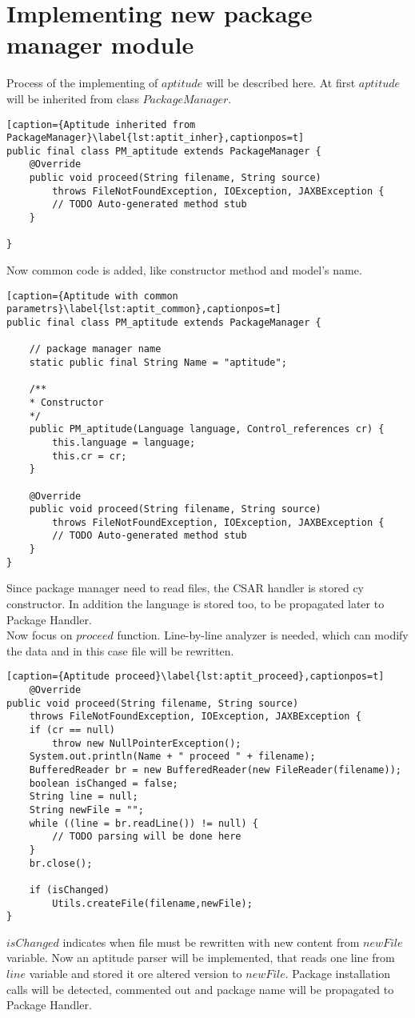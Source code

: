 \section{Implementing new package manager module}\label{sec:aptitude_imp}
Process of the implementing of $aptitude$ will be described here.
At first $aptitude$ will be inherited from class $PackageManager$.
\begin{lstlisting}[caption={Aptitude inherited from PackageManager}\label{lst:aptit_inher},captionpos=t] 
public final class PM_aptitude extends PackageManager {
	@Override
	public void proceed(String filename, String source)
		throws FileNotFoundException, IOException, JAXBException {
		// TODO Auto-generated method stub
	}
	
}
\end{lstlisting}
Now common code is added, like constructor method and model's name.
\begin{lstlisting}[caption={Aptitude with common parametrs}\label{lst:aptit_common},captionpos=t] 
public final class PM_aptitude extends PackageManager {

	// package manager name
	static public final String Name = "aptitude";
	
	/**
	* Constructor
	*/
	public PM_aptitude(Language language, Control_references cr) {
		this.language = language;
		this.cr = cr;
	}
	
	@Override
	public void proceed(String filename, String source)
		throws FileNotFoundException, IOException, JAXBException {
		// TODO Auto-generated method stub
	}
}
\end{lstlisting}
Since package manager need to read files, the CSAR handler is stored cy constructor.
In addition the language is stored too, to be propagated later to Package Handler.\\
Now focus on $proceed$ function. Line-by-line analyzer is needed, which can modify the data and in this case file will be rewritten.

\begin{lstlisting}[caption={Aptitude proceed}\label{lst:aptit_proceed},captionpos=t]
	@Override
public void proceed(String filename, String source)
	throws FileNotFoundException, IOException, JAXBException {
	if (cr == null)
		throw new NullPointerException();
	System.out.println(Name + " proceed " + filename);
	BufferedReader br = new BufferedReader(new FileReader(filename));
	boolean isChanged = false;
	String line = null;
	String newFile = "";
	while ((line = br.readLine()) != null) {
		// TODO parsing will be done here
	}
	br.close();

	if (isChanged)
		Utils.createFile(filename,newFile);
}	 
\end{lstlisting}
$isChanged$ indicates when file must be rewritten with new content from $newFile$ variable.
Now an aptitude parser will be implemented, that reads one line from $line$ variable and stored it ore altered version to $newFile$.
Package installation calls will be detected, commented out and package name will be propagated to Package Handler.

